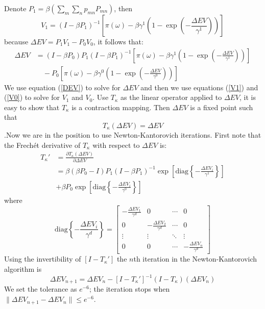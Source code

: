\documentclass[11pt]{article}
\begin{document}
Denote $P_{1}=\beta\left(\sum_{m}\sum_{n}p_{mn}P_{mn}\right)$, then
\[
V_{1}=\left(I-\beta P_{1}\right)^{-1}\left[\pi\left(\omega\right)-\beta\gamma^{1}\left(1-\exp\left(-\frac{\Delta EV}{\gamma^{1}}\right)\right)\right]
\]
 because $\Delta EV=P_{1}V_{1}-P_{0}V_{0}$, it follows that:
\begin{align}
\Delta EV & =\left(I-\beta P_{0}\right)P_{1}\left(I-\beta P_{1}\right)^{-1}\left[\pi\left(\omega\right)-\beta\gamma^{1}\left(1-\exp\left(-\frac{\Delta EV}{\gamma^{1}}\right)\right)\right]\label{DEV}\\
 & \quad-P_{0}\left[\pi\left(\omega\right)-\beta\gamma^{0}\left(1-\exp\left(-\frac{\Delta EV}{\gamma^{0}}\right)\right)\right]\nonumber 
\end{align}
We use equation (\ref{DEV}) to solve for $\Delta EV$ and then we
use equations (\ref{V1}) and (\ref{V0}) to solve for $V_{1}$ and
$V_{0}$. Use $T_{\kappa}$ as the linear operator applied to $\Delta EV$,
it is easy to show that $T_{\kappa}$ is a contraction mapping. Then
$\Delta EV$ is a fixed point such that 
\[
T_{\kappa}\left(\Delta EV\right)=\Delta EV
\]
.Now we are in the position to use Newton-Kantorovich iterations.
First note that the Frech\'{e}t derivative of $T_{\kappa}$ with
respect to $\Delta EV$ is:
\begin{align}
T_{\kappa}' & =\frac{\partial T_{\kappa}\left(\Delta EV\right)}{\partial\Delta EV}\\
 & =\beta\left(\beta P_{0}-I\right)P_{1}\left(I-\beta P_{1}\right)^{-1}\exp\left[\text{diag}\left\{ -\frac{\Delta EV_{i}}{\gamma^{1}}\right\} \right]\nonumber \\
 & +\beta P_{0}\exp\left[\text{diag}\left\{ -\frac{\Delta EV_{i}}{\gamma^{0}}\right\} \right]\nonumber 
\end{align}
where 
\[
\text{diag}\left\{ -\frac{\Delta EV_{i}}{\gamma^{d}}\right\} =\left[\begin{array}{cccc}
-\frac{\Delta EV_{1}}{\gamma^{d}} & 0 & \cdots & 0\\
0 & -\frac{\Delta EV_{2}}{\gamma^{d}} & \cdots & 0\\
\vdots & \vdots & \ddots & \vdots\\
0 & 0 & \cdots & -\frac{\Delta EV_{n}}{\gamma^{d}}
\end{array}\right]
\]
Using the invertibility of $\left[I-T_{\kappa}'\right]$ the $n$th
iteration in the Newton-Kantorovich algorithm is 
\[
\Delta EV_{n+1}=\Delta EV_{n}-\left[I-T_{\kappa}'\right]^{-1}\left(I-T_{\kappa}\right)\left(\Delta EV_{n}\right)
\]
We set the tolerance as $e^{-6}$; the iteration stops when $\|\Delta EV_{n+1}-\Delta EV_{n}\|\leq e^{-6}$. 
\end{document}
